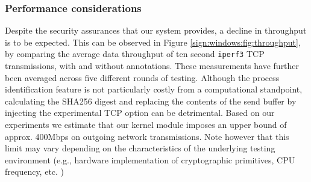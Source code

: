 \subsubsection{Performance considerations}
\label{sign:windows:evaluation:performance}

Despite the security assurances that our system provides, a decline in throughput is to be expected. This can be observed in Figure \ref{sign:windows:fig:throughput}, by comparing the average data throughput of ten second \texttt{iperf3} TCP transmissions, with and without annotations. These measurements have further been averaged across five different rounds of testing. Although the process identification feature is not particularly costly from a computational standpoint, calculating the SHA256 digest and replacing the contents of the send buffer by injecting the experimental TCP option can be detrimental. Based on our experiments we estimate that our kernel module imposes an upper bound of approx. 400Mbps on outgoing network transmissions. Note however that this limit may vary depending on the characteristics of the underlying testing environment (e.g., hardware implementation of cryptographic primitives, CPU frequency, etc. )



